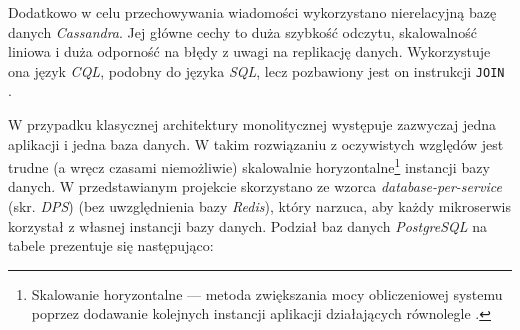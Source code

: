 Dodatkowo w celu przechowywania wiadomości wykorzystano nierelacyjną bazę danych \textit{Cassandra}. Jej główne cechy to
duża szybkość odczytu, skalowalność liniowa i duża odporność na błędy z uwagi na replikację danych. Wykorzystuje ona
język \textit{CQL}, podobny do języka \textit{SQL}, lecz pozbawiony jest on instrukcji \verb|JOIN|
\cite{bib:cassandra-overview}.

W przypadku klasycznej architektury monolitycznej występuje zazwyczaj jedna aplikacji i jedna baza danych. W takim
rozwiązaniu z oczywistych względów jest trudne (a wręcz czasami niemożliwie) skalowalnie
horyzontalne\footnote{Skalowanie horyzontalne — metoda zwiększania mocy obliczeniowej systemu poprzez dodawanie
  kolejnych instancji aplikacji działających równolegle \cite{bib:scaling-types}.} instancji bazy danych. W
przedstawianym projekcie skorzystano ze wzorca \textit{database-per-service} (skr. \textit{DPS}) (bez uwzględnienia bazy
\textit{Redis}), który narzuca, aby każdy mikroserwis korzystał z własnej instancji bazy danych. Podział baz danych
\textit{PostgreSQL} na tabele prezentuje się następująco:
%
